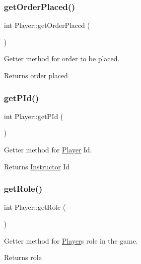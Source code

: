 \subsubsection{\texorpdfstring{get\+Order\+Placed()}{getOrderPlaced()}}
{\footnotesize\ttfamily int Player\+::get\+Order\+Placed (\begin{DoxyParamCaption}{ }\end{DoxyParamCaption})}



Getter method for order to be placed. 

\begin{DoxyReturn}{Returns}
order placed 
\end{DoxyReturn}
\mbox{\label{class_player_ad815840dfa1c1261900774b5ffd886e3}} 
\subsubsection{\texorpdfstring{get\+P\+Id()}{getPId()}}
{\footnotesize\ttfamily int Player\+::get\+P\+Id (\begin{DoxyParamCaption}{ }\end{DoxyParamCaption})}



Getter method for \hyperlink{class_player}{Player} Id. 

\begin{DoxyReturn}{Returns}
\hyperlink{class_instructor}{Instructor} Id 
\end{DoxyReturn}
\mbox{\label{class_player_a6baeff2a6218449299cb334c01f1dc28}} 
\subsubsection{\texorpdfstring{get\+Role()}{getRole()}}
{\footnotesize\ttfamily int Player\+::get\+Role (\begin{DoxyParamCaption}{ }\end{DoxyParamCaption})}



Getter method for \hyperlink{class_player}{Player}\textquotesingle{}s role in the game. 

\begin{DoxyReturn}{Returns}
role 
\end{DoxyReturn}
\mbox{\label{class_player_af67e6ee0de38f3e9635d35849f103449}} 
